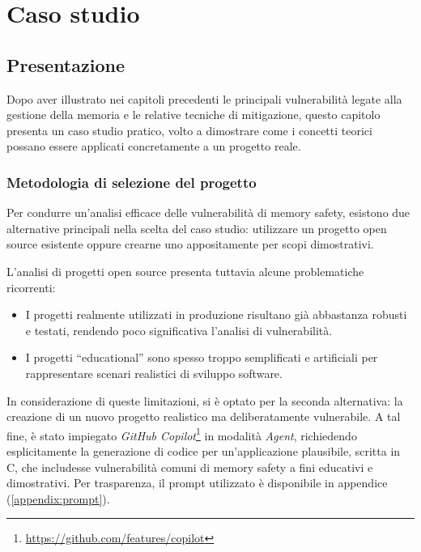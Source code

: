 \chapter{Caso studio}
\label{cha:real_case}

\section{Presentazione}
\label{sec:presentation}

Dopo aver illustrato nei capitoli precedenti le principali vulnerabilità legate alla
gestione della memoria e le relative tecniche di mitigazione, questo capitolo
presenta un caso studio pratico, volto a dimostrare come i concetti teorici possano
essere applicati concretamente a un progetto reale.

\subsection*{Metodologia di selezione del progetto}

Per condurre un'analisi efficace delle vulnerabilità di memory safety, esistono due
alternative principali nella scelta del caso studio: utilizzare un progetto open
source esistente oppure crearne uno appositamente per scopi dimostrativi.

L'analisi di progetti open source presenta tuttavia alcune problematiche
ricorrenti:
\begin{itemize}
  \item I progetti realmente utilizzati in produzione risultano già abbastanza robusti
    e testati, rendendo poco significativa l'analisi di vulnerabilità.

  \item I progetti ``educational'' sono spesso troppo semplificati e artificiali
    per rappresentare scenari realistici di sviluppo software.
\end{itemize}

In considerazione di queste limitazioni, si è optato per la seconda alternativa:
la creazione di un nuovo progetto realistico ma deliberatamente vulnerabile. A tal
fine, è stato impiegato \textit{GitHub Copilot}\footnote{\url{https://github.com/features/copilot}}
in modalità \textit{Agent}, richiedendo esplicitamente la generazione di codice
per un'applicazione plausibile, scritta in C, che includesse vulnerabilità
comuni di memory safety a fini educativi e dimostrativi. Per trasparenza, il
prompt utilizzato è disponibile in appendice (\autoref{appendix:prompt}).

